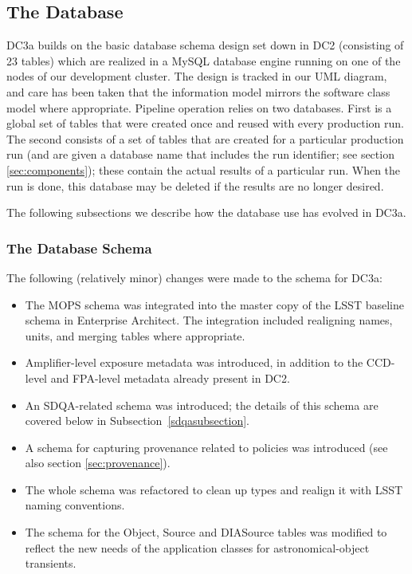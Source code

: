 
\subsection{The Database}

DC3a builds on the basic database schema design set down in DC2
(consisting of 23 tables) which are realized in a MySQL database
engine running on one of the nodes of our development cluster.  The
design is tracked in our UML diagram, and care has been taken that the
information model mirrors the software class model where appropriate.
Pipeline operation relies on two databases.  First is a global set of
tables that were created once and reused with every production run.
The second consists of a set of tables that are created for a
particular production run (and are given a database name that includes
the run identifier; see section \ref{sec:components}); these contain
the actual results of a particular run.  When the run is done, this
database may be deleted if the results are no longer desired.  

The following subsections we describe how the database use has evolved
in DC3a.  

\subsubsection{The Database Schema}

The following (relatively minor) changes were made to the schema for DC3a:

\begin{itemize}

\item The MOPS schema was integrated into the master copy of the LSST
  baseline schema in Enterprise Architect.  The integration included
  realigning names, units, and merging tables where appropriate.

\item Amplifier-level exposure metadata was introduced, in addition to
  the CCD-level and FPA-level metadata already present in DC2.

\item An SDQA-related schema was introduced; the details of this
  schema are covered below in Subsection~\ref{sdqasubsection}.

\item A schema for capturing provenance related to policies was
  introduced (see also section \ref{sec:provenance}).

\item The whole schema was refactored to clean up types and realign it
  with LSST naming conventions. 

\item The schema for the Object, Source and DIASource tables was
  modified to reflect the new needs of the application classes for
  astronomical-object transients. 
\end{itemize}

